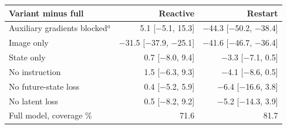 \begin{tabular}{@{}lrr@{}}
\toprule
Variant minus full & Reactive & Restart \\
\midrule
Auxiliary gradients blocked$^a$ & 5.1 [\ensuremath{-}5.1, 15.3] & \ensuremath{-}44.3 [\ensuremath{-}50.2, \ensuremath{-}38.4] \\
Image only & \ensuremath{-}31.5 [\ensuremath{-}37.9, \ensuremath{-}25.1] & \ensuremath{-}41.6 [\ensuremath{-}46.7, \ensuremath{-}36.4] \\
State only & 0.7 [\ensuremath{-}8.0, 9.4] & \ensuremath{-}3.3 [\ensuremath{-}7.1, 0.5] \\
No instruction & 1.5 [\ensuremath{-}6.3, 9.3] & \ensuremath{-}4.1 [\ensuremath{-}8.6, 0.5] \\
No future-state loss & 0.4 [\ensuremath{-}5.2, 5.9] & \ensuremath{-}6.4 [\ensuremath{-}16.6, 3.8] \\
No latent loss & 0.5 [\ensuremath{-}8.2, 9.2] & \ensuremath{-}5.2 [\ensuremath{-}14.3, 3.9] \\
\midrule
Full model, coverage \% & 71.6 & 81.7 \\
\bottomrule
\end{tabular}
